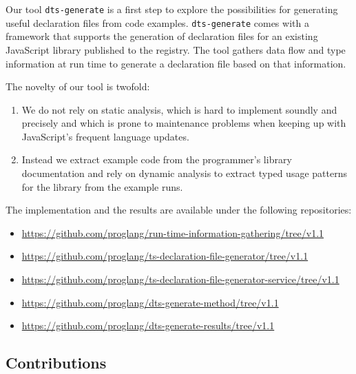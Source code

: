 \documentclass[english,cleveref,autoref,submission]{programming}
\begin{document}
Our tool \texttt{dts-generate} is a first step to explore the possibilities for
generating useful declaration files from code
examples. \texttt{dts-generate} comes with a framework that 
supports the generation of declaration files for an existing
JavaScript library published to the \NPM{} registry. The tool gathers
data flow and type information at run time to generate a declaration
file based on that information.

The novelty of our tool is twofold:
\begin{enumerate}
\item
  We do not rely on static analysis, which is hard to implement
  soundly and precisely and which is prone to maintenance problems
  when keeping up with JavaScript's frequent language updates.
\item
  Instead we extract example code from the programmer's library
  documentation and rely on dynamic analysis to extract typed usage
  patterns for the library from the example runs.
\end{enumerate}


The implementation and the results are available under the following repositories:

\begin{itemize}
  \item \url{https://github.com/proglang/run-time-information-gathering/tree/v1.1}
  \item \url{https://github.com/proglang/ts-declaration-file-generator/tree/v1.1}
  \item \url{https://github.com/proglang/ts-declaration-file-generator-service/tree/v1.1}
  \item \url{https://github.com/proglang/dts-generate-method/tree/v1.1}
  \item \url{https://github.com/proglang/dts-generate-results/tree/v1.1}
\end{itemize}

\subsection{Contributions}
\label{sec:contributions}
\end{document}
